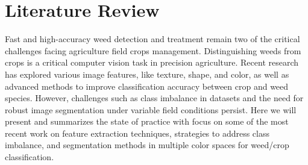 \documentclass[letterpaper, notitlepage]{report}
\begin{document}
%
%
%
%
%


\chapter{Literature Review}
\label{section:literature}
 
Fast and high-accuracy weed detection and treatment remain two of the critical challenges facing agriculture field crops management. Distinguishing weeds from crops is a critical computer vision task in precision agriculture. Recent research has explored various image features, like texture, shape, and color, as well as advanced methods to improve classification accuracy between crop and weed species. However, challenges such as class imbalance in datasets and the need for robust image segmentation under variable field conditions persist. Here we will present and summarizes the state of practice with focus on some of the most recent work on feature extraction techniques, strategies to address class imbalance, and segmentation methods in multiple color spaces for weed/crop classification.
\end{document}
